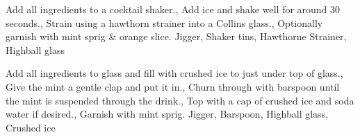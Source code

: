 \documentclass[../main.tex]{subfiles}
\begin{document}
    \cocktailDivider

    {
            {Add all ingredients to a cocktail shaker.},
            {Add ice and shake well for around 30 seconds.},
            {Strain using a hawthorn strainer into a Collins glass.},
            {Optionally garnish with mint sprig \& orange slice}.
    }
    {Jigger, Shaker tins, Hawthorne Strainer, Highball glass}

    \cocktailDivider


    {
            {Add all ingredients to glass and fill with crushed ice to just under top of glass.},
            {Give the mint a gentle clap and put it in.},
            {Churn through with barspoon until the mint is suspended through the drink.},
            {Top with a cap of crushed ice and soda water if desired.},
            {Garnish with mint sprig.}
    }
    {Jigger, Barspoon, Highball glass, Crushed ice}

    \clearpage
\end{document}
